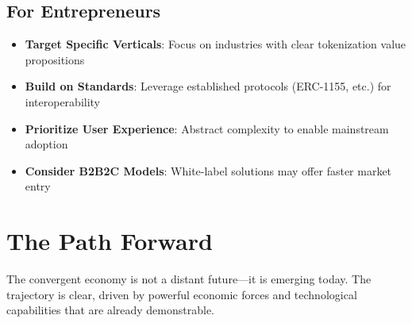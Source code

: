 \documentclass[11pt,a4paper]{report}
\begin{document}
\subsection{For Entrepreneurs}
\begin{itemize}
    \item \textbf{Target Specific Verticals}: Focus on industries with clear tokenization value propositions
    \item \textbf{Build on Standards}: Leverage established protocols (ERC-1155, etc.) for interoperability
    \item \textbf{Prioritize User Experience}: Abstract complexity to enable mainstream adoption
    \item \textbf{Consider B2B2C Models}: White-label solutions may offer faster market entry
\end{itemize}

\section{The Path Forward}

The convergent economy is not a distant future---it is emerging today. The trajectory is clear, driven by powerful economic forces and technological capabilities that are already demonstrable.
\end{document}
